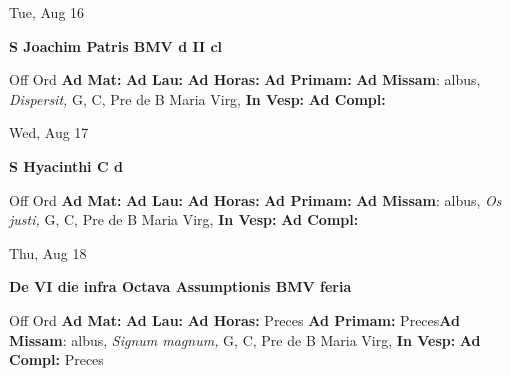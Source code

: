 \documentclass[10pt]{book}
\begin{document}
\begin{center}
\begin{minipage}{3.5in}
\vspace{2em}
\begin{center}Tue, Aug 16
\end{center}
\textbf{ \large S Joachim Patris BMV
\textnormal{\normalsize d II cl}}

\begin{justify}Off Ord
\textbf{Ad Mat: }
\textbf{Ad Lau: }
\textbf{Ad Horas: }
\textbf{Ad Primam: }\textbf{Ad Missam}: albus, \textit{Dispersit,} G, C, Pre de B Maria Virg, 
\textbf{In Vesp: }
\textbf{Ad Compl: }
\end{justify}
\end{minipage}
\end{center}

\begin{center}
\begin{minipage}{3.5in}
\vspace{2em}
\begin{center}Wed, Aug 17
\end{center}
\textbf{ \large S Hyacinthi C
\textnormal{\normalsize d}}

\begin{justify}Off Ord
\textbf{Ad Mat: }
\textbf{Ad Lau: }
\textbf{Ad Horas: }
\textbf{Ad Primam: }\textbf{Ad Missam}: albus, \textit{Os justi,} G, C, Pre de B Maria Virg, 
\textbf{In Vesp: }
\textbf{Ad Compl: }
\end{justify}
\end{minipage}
\end{center}

\begin{center}
\begin{minipage}{3.5in}
\vspace{2em}
\begin{center}Thu, Aug 18
\end{center}
\textbf{ \large De VI die infra Octava Assumptionis BMV
\textnormal{\normalsize feria}}

\begin{justify}Off Ord
\textbf{Ad Mat: }
\textbf{Ad Lau: }
\textbf{Ad Horas: }Preces
\textbf{Ad Primam: }Preces\textbf{Ad Missam}: albus, \textit{Signum magnum,} G, C, Pre de B Maria Virg, 
\textbf{In Vesp: }
\textbf{Ad Compl: }Preces
\end{justify}
\end{minipage}
\end{center}
\end{document}
